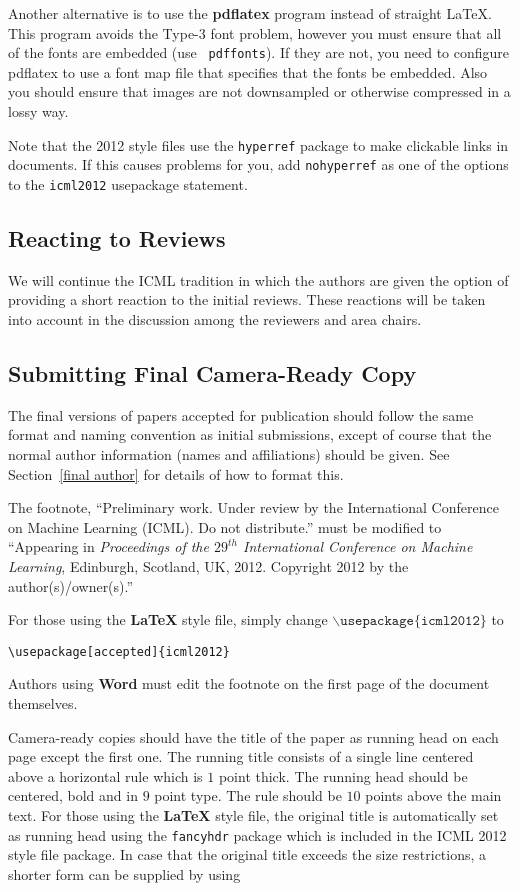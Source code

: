 \documentclass{article}
\begin{document}
Another alternative is to use the \textbf{pdflatex} program instead of
straight \LaTeX. This program avoids the Type-3 font problem, however
you must ensure that all of the fonts are embedded (use {\tt
pdffonts}). If they are not, you need to configure pdflatex to use a
font map file that specifies that the fonts be embedded. Also you
should ensure that images are not downsampled or otherwise compressed
in a lossy way.

Note that the 2012 style files use the {\tt hyperref} package to
make clickable links in documents.  If this causes problems for you,
add {\tt nohyperref} as one of the options to the {\tt icml2012}
usepackage statement.

\subsection{Reacting to Reviews}
We will continue the ICML tradition in which the authors are given the
option of providing a short reaction to the initial reviews. These
reactions will be taken into account in the discussion among the
reviewers and area chairs.

\subsection{Submitting Final Camera-Ready Copy}

The final versions of papers accepted for publication should follow the
same format and naming convention as initial submissions, except of
course that the normal author information (names and affiliations)
should be given.  See Section~\ref{final author} for details of how to
format this.

The footnote, ``Preliminary work.  Under review by the International
Conference on Machine Learning (ICML).  Do not distribute.'' must be
modified to ``Appearing in \textit{Proceedings of the
$\mathit{29}^{th}$ International Conference on Machine Learning},
Edinburgh, Scotland, UK, 2012.  Copyright 2012 by the author(s)/owner(s).''

For those using the \textbf{\LaTeX} style file, simply change
$\mathtt{\backslash usepackage\{icml2012\}}$ to 

\verb|\usepackage[accepted]{icml2012}|

\noindent
Authors using \textbf{Word} must edit the
footnote on the first page of the document themselves.

Camera-ready copies should have the title of the paper as running head
on each page except the first one.  The running title consists of a
single line centered above a horizontal rule which is $1$ point thick.
The running head should be centered, bold and in $9$ point type.  The
rule should be $10$ points above the main text.  For those using the
\textbf{\LaTeX} style file, the original title is automatically set as running
head using the {\tt fancyhdr} package which is included in the ICML
2012 style file package.  In case that the original title exceeds the
size restrictions, a shorter form can be supplied by using
\end{document}
